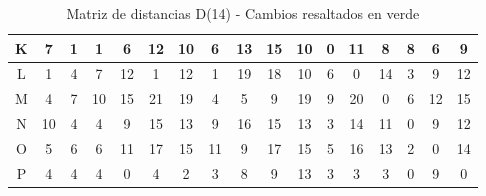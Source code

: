 \documentclass[12pt]{article}
\begin{document}
\begin{table}[h!]
\begin{tabular}{|c|c|c|c|c|c|c|c|c|c|c|c|c|c|c|c|c|}
K & 7 & 1 & 1 & 6 & 12 & 10 & 6 & 13 & 15 & 10 & 0 & 11 & 8 & 8 & 6 & 9 \\\hline
L & 1 & 4 & \cellcolor{lightgreen} 7 & \cellcolor{lightgreen} 12 & 1 & 12 & 1 & \cellcolor{lightgreen} 19 & \cellcolor{lightgreen} 18 & 10 & \cellcolor{lightgreen} 6 & 0 & \cellcolor{lightgreen} 14 & 3 & 9 & 12 \\\hline
M & 4 & 7 & \cellcolor{lightgreen} 10 & \cellcolor{lightgreen} 15 & \cellcolor{lightgreen} 21 & \cellcolor{lightgreen} 19 & 4 & 5 & 9 & 19 & \cellcolor{lightgreen} 9 & \cellcolor{lightgreen} 20 & 0 & 6 & 12 & 15 \\\hline
N & 10 & 4 & 4 & 9 & 15 & 13 & 9 & 16 & 15 & 13 & 3 & 14 & 11 & 0 & 9 & 12 \\\hline
O & 5 & \cellcolor{lightgreen} 6 & \cellcolor{lightgreen} 6 & \cellcolor{lightgreen} 11 & \cellcolor{lightgreen} 17 & \cellcolor{lightgreen} 15 & \cellcolor{lightgreen} 11 & 9 & \cellcolor{lightgreen} 17 & \cellcolor{lightgreen} 15 & \cellcolor{lightgreen} 5 & \cellcolor{lightgreen} 16 & \cellcolor{lightgreen} 13 & 2 & 0 & \cellcolor{lightgreen} 14 \\\hline
P & 4 & \cellcolor{lightgreen} 4 & \cellcolor{lightgreen} 4 & 0 & 4 & 2 & 3 & 8 & 9 & 13 & \cellcolor{lightgreen} 3 & 3 & 3 & 0 & 9 & 0 \\\hline
\end{tabular}
\caption{Matriz de distancias D(14) - Cambios resaltados en verde}
\end{table}
\end{document}
